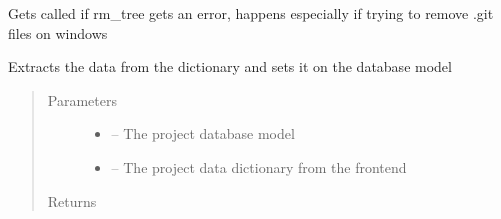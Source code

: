 \documentclass[letterpaper,10pt,english]{sphinxmanual}
\begin{document}

\begin{fulllineitems}
\label{_source/son_editor.impl:son_editor.impl.projectsimpl.on_rm_error}
Gets called if rm\_tree gets an error, happens
especially if trying to remove .git files on windows

\end{fulllineitems}


\begin{fulllineitems}
\label{_source/son_editor.impl:son_editor.impl.projectsimpl.set_data}
Extracts the data from the dictionary and sets it on the database model
\begin{quote}\begin{description}
\item[{Parameters}] \leavevmode\begin{itemize}
\item {} 
 -- The project database model

\item {} 
 -- The project data dictionary from the frontend

\end{itemize}

\item[{Returns}] \leavevmode


\end{description}\end{quote}

\end{fulllineitems}

\end{document}
